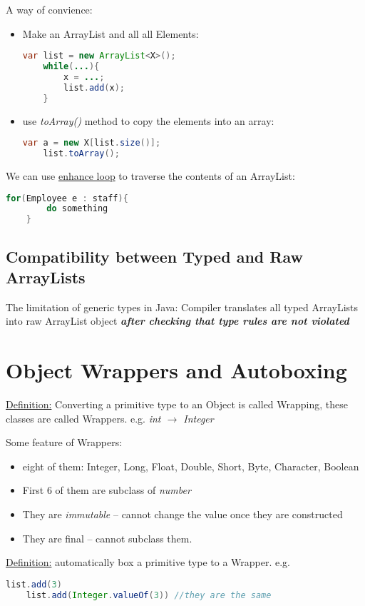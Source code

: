 \documentclass[12pt]{article}
\begin{document}
A way of convience:
\begin{itemize}
    \item Make an ArrayList and all all Elements:
\begin{lstlisting}[language=Java]
    var list = new ArrayList<X>();
    while(...){
        x = ...;
        list.add(x);
    }
\end{lstlisting}
    \item use \emph{toArray()} method to copy the elements into an array:
\begin{lstlisting}[language=Java]
    var a = new X[list.size()];
    list.toArray();
\end{lstlisting}
\end{itemize}

We can use \underline{enhance loop} to traverse the contents of an ArrayList:
\begin{lstlisting}[language=Java]
    for(Employee e : staff){
        do something
    }
\end{lstlisting}

\subsection{Compatibility between Typed and Raw ArrayLists}
The limitation of generic types in Java:\newline
Compiler translates all typed ArrayLists into raw ArrayList object \emph{\textbf{after checking that type rules are not violated}}

\section{Object Wrappers and Autoboxing}
\underline{Definition:} Converting a primitive type to an Object is called Wrapping, these classes are 
called Wrappers. e.g. \emph{int $\rightarrow$ Integer}

Some feature of Wrappers:
\begin{itemize}
    \item eight of them: Integer, Long, Float, Double, Short, Byte, Character, Boolean
    \item First 6 of them are subclass of \emph{number}
    \item They are \emph{immutable} -- cannot change the value once they are constructed
    \item They are final -- cannot subclass them.
\end{itemize}

\underline{Definition:} automatically box a primitive type to a Wrapper. e.g.
\begin{lstlisting}[language=Java]
    list.add(3)
    list.add(Integer.valueOf(3)) //they are the same
\end{lstlisting}
\end{document}
